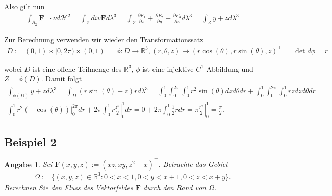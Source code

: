 \documentclass[]{article}
\newtheorem*{angabe*}{Angabe}
\begin{document}
\begin{enumerate}[label=(\roman*)]
	Also gilt nun
	\begin{align*}
		\int_{\partial_Z} \bm{F}^\top \cdot \nu d\mathcal{H}^2 = \int_Z div\bm{F} d\lambda^3 = \int_Z \frac{\partial F_1}{\partial x} + \frac{\partial F_2}{\partial y} + \frac{\partial F_3}{\partial z} d\lambda^3 = \int_Z y + z d\lambda^3
	\end{align*}

	Zur Berechnung verwenden wir wieder den Transformationssatz
	\begin{align*}
		D := (0,1)\times[0,2\pi)\times(0,1) && \phi:D\rightarrow\mathbb{R}^3, (r,\theta,z) \mapsto (r\cos(\theta), r\sin(\theta), z)^\top && \det d\phi = r
	\end{align*}

	wobei $D$ ist eine offene Teilmenge des $\mathbb{R}^3$, $\phi$ ist eine injektive $C^1$-Abbildung und $Z=\phi(D)$. Damit folgt 
	\begin{align*}
		\int_{\phi(D)} y + z d\lambda^3 = \int_D (r\sin(\theta) + z)r d\lambda^3 = \int_{0}^{1} \int_{0}^{2\pi} \int_{0}^{1} r^2 \sin(\theta) dz d\theta dr + \int_{0}^{1} \int_{0}^{2\pi} \int_{0}^{1} rz dz d\theta dr = \\
		\int_{0}^{1} r^2 \left.(-\cos(\theta))\right\vert_0^{2\pi} dr + 2\pi \int_{0}^{1} r \left. \frac{z^2}{2}\right\vert_0^1 dr = 0 + 2\pi \int_0^1 \frac{1}{2} r dr = \pi \left. \frac{r^2}{2}\right\vert_0^1 = \frac{\pi}{2}.
	\end{align*}

\end{enumerate}

\subsection*{Beispiel 2}
\begin{angabe*}
	Sei $\bm{F}(x,y,z):=(xz, xy, z^2-x)^\top$. Betrachte das Gebiet
	\begin{align*}
		\Omega := \{(x,y,z)\in \mathbb{R}^3: 0<x<1, 0<y<x+1, 0<z<x+y\}.
	\end{align*}
	Berechnen Sie den Fluss des Vektorfeldes $\bm{F}$ durch den Rand von $\Omega$.
\end{angabe*}
\end{document}
